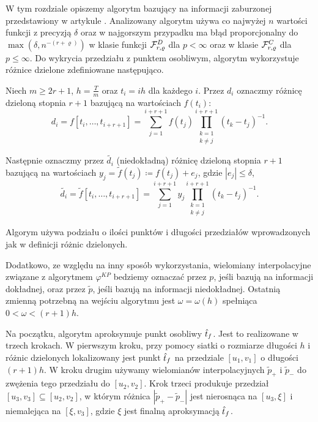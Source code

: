 \documentclass[oik, pdftex, man]{mgrwms}
\begin{document}
    W tym rozdziale opiszemy algorytm bazujący na informacji zaburzonej przedstawiony w artykule \cite{AoP}. Analizowany algorytm używa co najwyżej $n$ wartości funkcji z precyzją $\delta $ oraz w najgorszym przypadku ma błąd proporcjonalny do $\max{(\delta, n^{-(r + \varrho) })}$ w klasie funkcji $\mathcal{F}^D_{r,\varrho }$ dla $p < \infty$ oraz w klasie $\mathcal{F}^C_{r,\varrho }$ dla $p \leq \infty$. Do wykrycia przedziału z punktem osobliwym, algorytm wykorzystuje różnice dzielone zdefiniowane następująco.
    
    Niech $m \geq 2r + 1$, $h = \frac{T}{m}$ oraz $t_{i} = ih$ dla każdego $i$. Przez $d_{i}$ oznaczmy różnicę dzieloną stopnia $r+1$ bazującą na wartościach $f(t_{i})$:
    \begin{equation} \label{eq:30:roznica_dzielna}
        d_{i} = f[t_{i}, \dots, t_{i+r+1}] = \sum_{j = 1}^{i+r+1} f(t_{j}) \prod_{\substack{k=1 \\ k \neq j}}^{i+r+1}(t_{k}-t_{j})^{-1}.
    \end{equation}

    Następnie oznaczmy przez $\tilde{d_i}$ (niedokładną) różnicę dzieloną stopnia $r+1$ bazującą na wartościach $y_{j} = \tilde{f}(t_{j}) \coloneqq f(t_{j}) + e_{j}$, gdzie $|e_{j}| \leq \delta$,
    \begin{equation} \label{eq:31:niedokladna_roznica_dzielna}
        \tilde{d_{i}} = \tilde{f}[t_{i}, \dots, t_{i+r+1}] = \sum_{j = 1}^{i+r+1} y_{j} \prod_{\substack{k=1 \\ k \neq j}}^{i+r+1}(t_{k}-t_{j})^{-1}.
    \end{equation}

    Algorym używa podziału o ilości punktów i długości przedziałów wprowadzonych jak w definicji różnic dzielonych. 
    
    Dodatkowo, ze względu na inny sposób wykorzystania, wielomiany interpolacyjne związane z algorytmem $\varphi^{KP}$ bedziemy oznaczać przez $p$, jeśli bazują na informacji dokładnej, oraz przez $\tilde{p}$, jeśli bazują na informacji niedokładnej. Ostatnią zmienną potrzebną na wejściu algorytmu jest $\omega  = \omega(h)$ spełniąca $0 < \omega < (r + 1)h $.
    
    Na początku, algorytm aproksymuje punkt osobliwy $\hat{t}_f$. Jest to realizowane w trzech krokach. W pierwszym kroku, przy pomocy siatki o rozmiarze długości $h$ i różnic dzielonych lokalizowany jest punkt $\hat{t}_f$ na przedziale $[u_1, v_1]$ o długości $(r + 1)h$. W kroku drugim używamy wielomianów interpolacyjnych $\tilde{p}_+$ i $\tilde{p}_-$ do zwężenia tego przedziału do $[u_2, v_2]$. Krok trzeci produkuje przedział $[u_3, v_3] \subseteq [u_2, v_2]$, w którym różnica $|\tilde{p}_{+} - \tilde{p}_{-}|$ jest nierosnąca na $[u_3, \xi]$ i niemalejąca na $[\xi, v_3]$, gdzie $\xi$ jest finalną aproksymacją $\hat{t}_f$.
\end{document}
